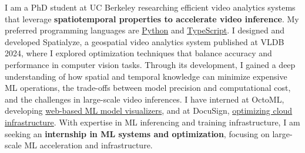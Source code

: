 \cvsummarysection


\begin{cvparagraph}

I am a PhD student at UC Berkeley researching efficient video analytics systems that leverage {\bf spatiotemporal properties to accelerate video inference}.
My preferred programming languages are \underline{Python} and \underline{TypeScript}.
I designed and developed Spatialyze, a geospatial video analytics system published at VLDB 2024, where I explored optimization techniques that balance accuracy and performance in computer vision tasks.
Through its development, I gained a deep understanding of how spatial and temporal knowledge can minimize expensive ML operations, the trade-offs between model precision and computational cost, and the challenges in large-scale video inferences.
I have interned at OctoML, developing \underline{web-based ML model visualizers}, and at DocuSign, \underline{optimizing cloud infrastructure}.
With expertise in ML inferencing and training infrastructure, I am seeking an {\bf internship in ML systems and optimization}, focusing on large-scale ML acceleration and infrastructure.
\end{cvparagraph}
\vspace{-1mm}
